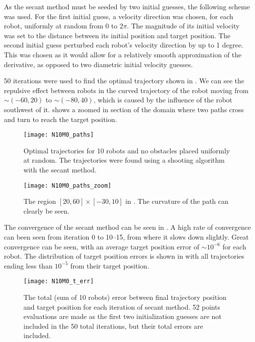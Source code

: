 \documentclass[11pt]{article}
\begin{document}
As the secant method must be seeded by two initial guesses, the following scheme was used. For the first initial guess, a velocity direction was chosen, for each robot, uniformly at random from \(0\) to \(2\pi\). The magnitude of its initial velocity was set to the distance between its initial position and target position. The second initial guess perturbed each robot's velocity direction by up to 1 degree. This was chosen as it would allow for a relatively smooth approximation of the derivative, as opposed to two diametric initial velocity guesses.

50 iterations were used to find the optimal trajectory shown in . We can see the repulsive effect between robots in the curved trajectory of the robot moving from \(\sim(-60,20)\) to \(\sim(-80,40)\), which is caused by the influence of the robot southwest of it.  shows a zoomed in section of the domain where two paths cross and turn to reach the target position.

\begin{figure}
	\centering
	\texttt{[image: N10M0\_paths]}
	\caption{Optimal trajectories for 10 robots and no obstacles placed uniformly at random. The trajectories were found using a shooting algorithm with the secant method.}
	\label{fig:n10m0-paths}
\end{figure}

\begin{figure}
	\centering
	\texttt{[image: N10M0\_paths\_zoom]}
	\caption{The region \([20,60] \times [-30,10]\) in . The curvature of the path can clearly be seen.}
	\label{fig:n10m0-paths-zoom}
\end{figure}

\clearpage

The convergence of the secant method can be seen in . A high rate of convergence can been seen from iteration 0 to 10--15, from where it slows down slightly. Great convergence can be seen, with an average target position error of \(\sim 10^{-6}\) for each robot. The distribution of target position errors is shown in  with all trajectories ending less than \(10^{-5}\) from their target position.

\begin{figure}
	\centering
	\texttt{[image: N10M0\_t\_err]}
	\caption{The total (sum of 10 robots) error between final trajectory position and target position for each iteration of secant method. 52 points evaluations are made as the first two initialization guesses are not included in the 50 total iterations, but their total errors are included.}
	\label{fig:n10m0-t-err}
\end{figure}
\end{document}
